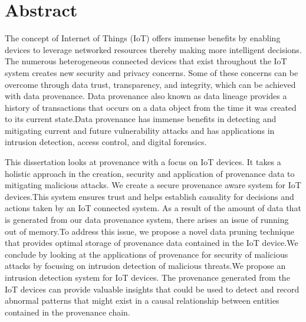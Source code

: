 

\chapter*{Abstract}
The concept of Internet of Things (IoT) offers immense benefits by
enabling devices to leverage networked resources thereby making more intelligent
decisions. The numerous heterogeneous connected devices that exist throughout
the IoT system creates new security and privacy concerns. Some of these concerns can
be overcome through data trust, transparency, and integrity, which can be
achieved with data provenance. Data provenance also known as data lineage provides a history of transactions that occurs on a data object from the time it was created to its current state.Data provenance has immense benefits in detecting and mitigating current and future vulnerability attacks and has applications in intrusion detection, access control, and digital forensics.  \par This dissertation looks at provenance with a focus on IoT devices. It takes a holistic approach in the creation, security and application of provenance data to mitigating malicious attacks. We create a secure provenance aware system for IoT devices.This system ensures trust and helps establish causality for decisions and actions taken by an IoT connected system. As a result of the amount of data that is generated from our data provenance system, there arises an issue of running out of memory.To address this issue, we propose a novel data pruning technique that provides optimal storage of provenance data contained in the IoT device.We conclude by looking at the applications of provenance for security of malicious attacks by focusing on intrusion detection of malicious threats.We propose an intrusion detection system for IoT devices. The provenance generated from the IoT devices can provide valuable insights that could be used to detect and record abnormal patterns that might exist in a causal relationship between entities contained in the provenance chain.

